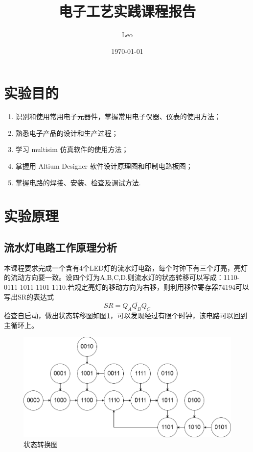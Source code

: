 \documentclass{ctexart}
\title{电子工艺实践课程报告}
\author{Leo}
\date{\today}
\begin{document}
\maketitle



\section{实验目的}
\begin{enumerate}
    \item 识别和使用常用电子元器件，掌握常用电子仪器、仪表的使用方法；
    \item 熟悉电子产品的设计和生产过程；
    \item 学习 multisim 仿真软件的使用方法；
    \item 掌握用 Altium Designer 软件设计原理图和印制电路板图；
    \item 掌握电路的焊接、安装、检查及调试方法.
\end{enumerate}
\section{实验原理}
\subsection{流水灯电路工作原理分析}
本课程要求完成一个含有4个LED灯的流水灯电路，每个时钟下有三个灯亮，亮灯的流动方向要一致。设四个灯为A,B,C,D.则流水灯的状态转移可以写成：1110-0111-1011-1101-1110.若规定亮灯的移动方向为右移，则利用移位寄存器74194可以写出SR的表达式
\begin{equation}
    SR=\overline{Q_A Q_B Q_C}
\end{equation}
检查自启动，做出状态转移图如图\ref{状态转移图}，可以发现经过有限个时钟，该电路可以回到主循环上。
\begin{figure}[H]
    \centering
    \includegraphics[scale=0.5]{pic/状态转移图.drawio.png}
    \caption{状态转换图}
    \label{状态转移图}
\end{figure}
\end{document}
